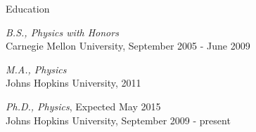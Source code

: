 \newlength{\oldcvlabelwidth}
\newlength{\oldcvlabelsep}

\setlength{\oldcvlabelwidth}{\cvlabelwidth}
\setlength{\oldcvlabelsep}{\cvlabelsep}

\setlength{\cvlabelwidth}{1em}

\begin{cvlist}{Education}
\item \emph{B.S., Physics with Honors}\\
Carnegie Mellon University, September 2005 - June 2009
\item \emph{M.A., Physics}\\
Johns Hopkins University, 2011
\item \emph{Ph.D., Physics}, Expected May 2015\\
  Johns Hopkins University, September 2009 - present  
\end{cvlist}

\setlength{\cvlabelwidth}{0em}
\setlength{\cvlabelsep}{\labelsep}

